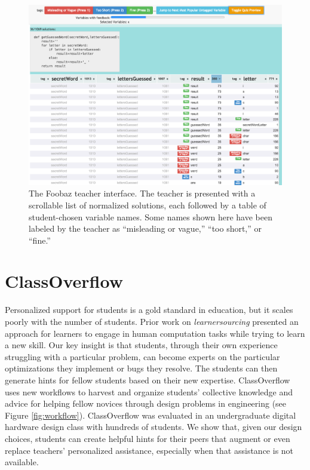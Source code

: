 \begin{figure}
	\centering
	\includegraphics[width=1.0\linewidth]{Body/figures/FoobazInitialFat.png}
	\caption{The Foobaz teacher interface. The teacher is presented with a scrollable list of normalized solutions, each followed by a table of student-chosen variable names. Some names shown here have been labeled by the teacher as ``misleading or vague,'' ``too short,'' or ``fine.''}
	\label{fig:figure2}
\end{figure}


\section{ClassOverflow}

Personalized support for students is a gold standard in education, but it scales poorly with the number of students. Prior work on \textit{learnersourcing} presented an approach for learners to engage in human computation tasks while trying to learn a new skill. Our key insight is that students, through their own experience struggling with a particular problem, can become experts on the particular optimizations they implement or bugs they resolve. The students can then generate hints for fellow students based on their new expertise. ClassOverflow  uses new workflows to harvest and organize students' collective knowledge and advice for helping fellow novices through design problems in engineering (see Figure \ref{fig:workflow}). ClassOverflow was evaluated in an undergraduate digital hardware design class with hundreds of students. We show that, given our design choices, students can create helpful hints for their peers that augment or even replace teachers' personalized assistance, especially when that assistance is not available.


